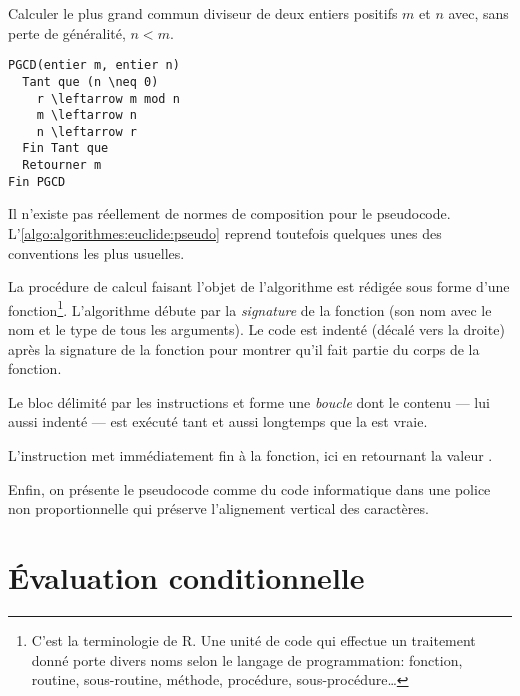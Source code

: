 \begin{algorithme}
  \label{algo:algorithmes:euclide:pseudo}
  Calculer le plus grand commun diviseur de deux entiers positifs $m$
  et $n$ avec, sans perte de généralité, $n < m$.
\begin{Schunk}
\begin{Verbatim}[commandchars=\\\{\}]
PGCD(entier m, entier n)
  Tant que (n \neq 0)
    r \leftarrow m mod n
    m \leftarrow n
    n \leftarrow r
  Fin Tant que
  Retourner m
Fin PGCD
\end{Verbatim}
\end{Schunk}
\end{algorithme}


Il n'existe pas réellement de normes de composition pour le
pseudocode. L'\autoref{algo:algorithmes:euclide:pseudo} reprend
toutefois quelques unes des conventions les plus usuelles.

La procédure de calcul faisant l'objet de l'algorithme est rédigée
sous forme d'une fonction\footnote{%
  C'est la terminologie de R. Une unité de code qui effectue un
  traitement donné porte divers noms selon le langage de
  programmation: fonction, routine, sous-routine, méthode, procédure,
  sous-procédure\dots}. %
L'algorithme débute par la \emph{signature} de la
fonction (son nom avec le nom et le type de tous les arguments). Le
code est indenté (décalé vers la droite) après la
signature de la fonction pour montrer qu'il fait partie du corps de la
fonction.

Le bloc délimité par les instructions  et  forme une
\emph{boucle} dont le contenu --- lui aussi indenté ---
est exécuté tant et aussi longtemps que la  est vraie.

L'instruction  met immédiatement fin à la fonction,
ici en retournant la valeur .

Enfin, on présente le pseudocode comme du code informatique dans une
police non proportionnelle qui préserve l'alignement vertical des
caractères.


\section{Évaluation conditionnelle}
\label{sec:algorithmes:if-else}

